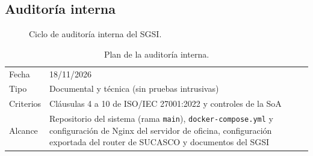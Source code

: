 \subsection{Auditoría interna}

\begin{figure}[H]
\centering
{}
\caption{Ciclo de auditoría interna del SGSI.}
\label{fig:ce03-sgsi-auditoria}
\end{figure}

\begin{table}[htbp]
\centering
\caption{Plan de la auditoría interna.}
\label{tab:ce03-sgsi-plan-auditoria}
\small
\begin{tabularx}{\textwidth}{L{2.6cm}X}
\toprule
Fecha & 18/11/2026 \\
Tipo & Documental y técnica (sin pruebas intrusivas) \\
Criterios & Cláusulas 4 a 10 de ISO/IEC 27001:2022 y controles de la SoA \\
Alcance & Repositorio del sistema (rama \texttt{main}), \texttt{docker-compose.yml} y configuración de Nginx del servidor de oficina, configuración exportada del router de SUCASCO y documentos del SGSI \\
\bottomrule
\end{tabularx}
\end{table}

